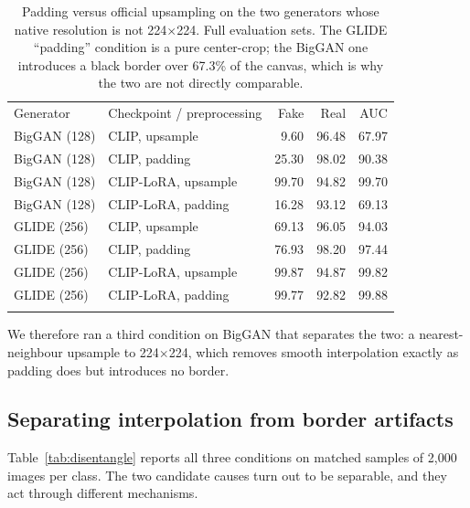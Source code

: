 \documentclass[3p,times,procedia]{elsarticle}
\begin{document}
\begin{table}[h]
\caption{Padding versus official upsampling on the two generators whose
native resolution is not 224$\times$224. Full evaluation sets. The GLIDE
``padding'' condition is a pure center-crop; the BigGAN one introduces a
black border over 67.3\% of the canvas, which is why the two are not
directly comparable.}
\label{tab:glidepreproc}
\begin{tabular*}{\hsize}{@{\extracolsep{\fill}}llrrr@{}}
\toprule
Generator & Checkpoint / preprocessing & Fake & Real & AUC \\
\colrule
BigGAN (128) & CLIP, upsample & 9.60 & 96.48 & 67.97 \\
BigGAN (128) & CLIP, padding & 25.30 & 98.02 & 90.38 \\
BigGAN (128) & CLIP-LoRA, upsample & 99.70 & 94.82 & 99.70 \\
BigGAN (128) & CLIP-LoRA, padding & 16.28 & 93.12 & 69.13 \\
GLIDE (256) & CLIP, upsample & 69.13 & 96.05 & 94.03 \\
GLIDE (256) & CLIP, padding & 76.93 & 98.20 & 97.44 \\
GLIDE (256) & CLIP-LoRA, upsample & 99.87 & 94.87 & 99.82 \\
GLIDE (256) & CLIP-LoRA, padding & 99.77 & 92.82 & 99.88 \\
\botrule
\end{tabular*}
\end{table}

We therefore ran a third condition on BigGAN that separates the two: a
nearest-neighbour upsample to 224$\times$224, which removes smooth
interpolation exactly as padding does but introduces no border.

\subsection{Separating interpolation from border artifacts}
\label{sec:disentangle}

Table~\ref{tab:disentangle} reports all three conditions on matched samples
of 2{,}000 images per class. The two candidate causes turn out to be
separable, and they act through different mechanisms.
\end{document}
